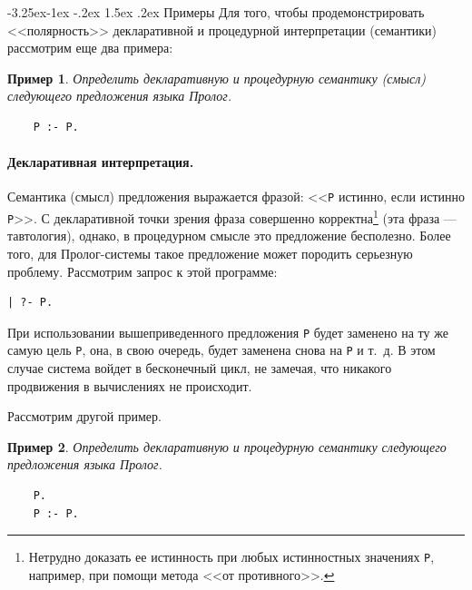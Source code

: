 \documentclass[12pt, openany, twoside]{book} %
\makeatletter
\newtheorem{example}{Пример}[chapter]
\renewcommand\subsubsection{\@startsection{subsubsection}{3}{\z@}%
                                     {-3.25ex\@plus -1ex \@minus -.2ex}%
                                     {1.5ex \@plus .2ex}%
                                     {\normalfont\normalsize\bfseries}}
\makeatother
\begin{document}
\subsubsection{Примеры}
Для того, чтобы продемонстрировать <<полярность>> декларативной и процедурной интерпретации (семантики) рассмотрим еще два примера:

\begin{example}
Определить декларативную и процедурную семантику (смысл) следующего предложения языка Пролог.
\end{example}
{\tt\begin{verbatim}
    P :- P.
\end{verbatim}}

\paragraph{Декларативная интерпретация.}
\noindent Семантика (смысл) предложения выражается фразой: <<{\tt P} истинно, если истинно {\tt P}>>. С декларативной точки зрения фраза совершенно корректна\footnote{Нетрудно доказать ее истинность при любых истинностных значениях {\tt P}, например, при помощи метода <<от противного>>.} (эта фраза --- тавтология),  однако, в процедурном смысле это предложение бесполезно. Более того, для Пролог-системы такое предложение может породить серьезную проблему. Рассмотрим запрос к этой программе:
{\tt\begin{verbatim}
| ?- P.
\end{verbatim}}
\noindent При использовании вышеприведенного предложения {\tt P} будет заменено на ту же самую цель {\tt P}, она, в свою очередь, будет заменена снова на {\tt P} и т.~д. В этом случае система войдет в бесконечный цикл, не замечая, что никакого продвижения в вычислениях не происходит.

Рассмотрим другой пример.
\begin{example}
Определить декларативную и процедурную семантику следующего предложения языка Пролог.
\end{example}
{\tt\begin{verbatim}
    P.
    P :- P.
\end{verbatim}}
\end{document}

